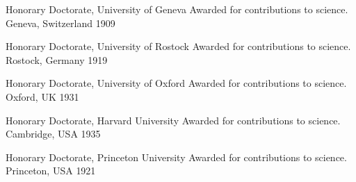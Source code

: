 
\begin{cvhonors}
    
  \cvhonor
    {Honorary Doctorate, University of Geneva} %
    {Awarded for contributions to science.} %
    {Geneva, Switzerland} %
    {1909} %


  \cvhonor
    {Honorary Doctorate, University of Rostock} %
    {Awarded for contributions to science.} %
    {Rostock, Germany} %
    {1919} %


  \cvhonor
    {Honorary Doctorate, University of Oxford} %
    {Awarded for contributions to science.} %
    {Oxford, UK} %
    {1931} %


  \cvhonor
    {Honorary Doctorate, Harvard University} %
    {Awarded for contributions to science.} %
    {Cambridge, USA} %
    {1935} %


  \cvhonor
    {Honorary Doctorate, Princeton University} %
    {Awarded for contributions to science.} %
    {Princeton, USA} %
    {1921} %

\end{cvhonors}

